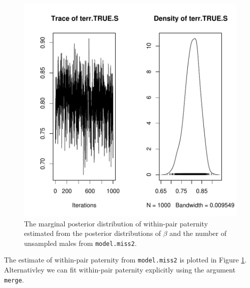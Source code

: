 \documentclass{article}
\begin{document}
\begin{figure}[!h]
\begin{center}
\includegraphics{Tutorial-081}
\end{center}
\caption{The marginal posterior distribution of within-pair paternity estimated from the posterior distributions of $\beta$ and the number of unsampled males from \texttt{model.miss2}.}
\label{EPP2Test-fig}
\end{figure}

The estimate of within-pair paternity from \texttt{model.miss2} is plotted in Figure \ref{EPP2Test-fig}.  Alternativley we can fit within-pair paternity explicitly using the argument \texttt{merge}. 

\begin{Schunk}
\end{Schunk}
\end{document}
